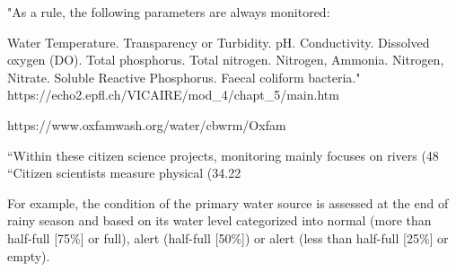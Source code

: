 "As a rule, the following parameters are always monitored:

Water Temperature.
Transparency or Turbidity.
pH.
Conductivity.
Dissolved oxygen (DO).
Total phosphorus.
Total nitrogen.
Nitrogen, Ammonia.
Nitrogen, Nitrate.
Soluble Reactive Phosphorus.
Faecal coliform bacteria." https://echo2.epfl.ch/VICAIRE/mod_4/chapt_5/main.htm

https://www.oxfamwash.org/water/cbwrm/Oxfam%

“Within these citizen science projects, monitoring mainly focuses on rivers (48%
“Citizen scientists measure physical (34.22%

For example, the condition of the primary water source is assessed at the end of rainy season and based on its water level categorized into normal (more than half-full [75\%] or full), alert (half-full [50\%]) or alert (less than half-full [25\%] or empty).


